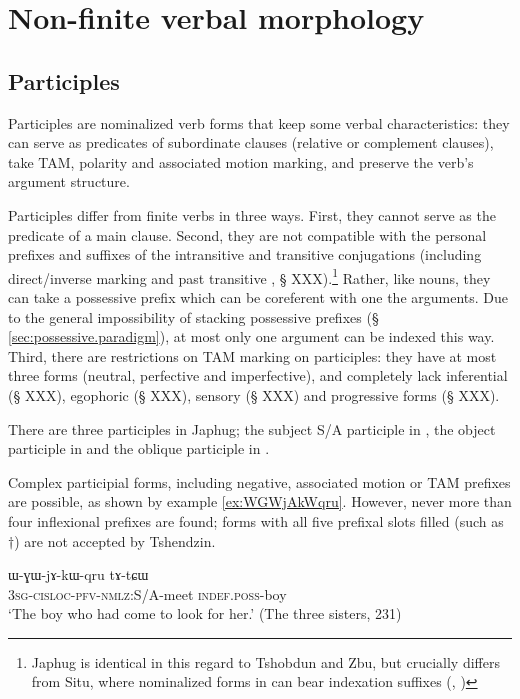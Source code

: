 \chapter{Non-finite verbal morphology}

\section{Participles}
Participles are nominalized verb forms that keep some verbal characteristics: they can serve as predicates of subordinate clauses (relative or complement clauses), take TAM, polarity and associated motion marking, and preserve the verb's argument structure.

Participles differ from finite verbs in three ways. First, they cannot serve as the predicate of a main clause. Second, they are not compatible with the personal prefixes and suffixes of the intransitive and transitive conjugations (including direct/inverse marking and past transitive , § XXX).\footnote{Japhug is identical in this regard to Tshobdun and Zbu, but crucially differs from Situ, where nominalized forms in  can bear indexation suffixes (\citet{jackson06guanxiju}, \citet{jacksonlin07}) } Rather, like nouns, they can take a possessive prefix which can be coreferent with one the arguments. Due to the general impossibility of stacking possessive prefixes (§ \ref{sec:possessive.paradigm}), at most only one argument can be indexed this way. Third, there are restrictions on TAM marking on participles: they have at most three forms (neutral, perfective and imperfective), and completely lack inferential (§ XXX), egophoric (§ XXX), sensory (§ XXX) and progressive forms (§ XXX).

There are three participles in Japhug; the subject S/A participle in , the object participle in  and the oblique participle in . 

Complex participial forms, including negative, associated motion or TAM prefixes are possible, as shown by example \ref{ex:WGWjAkWqru}. However, never more than four inflexional prefixes are found; forms with all five prefixal slots filled (such as $\dagger$) are not accepted by Tshendzin.

 \begin{exe}
\ex \label{ex:WGWjAkWqru}
\gll ɯ-ɣɯ-jɤ-kɯ-qru  	tɤ-tɕɯ  	   \\
  \textsc{3sg}-\textsc{cisloc}-\textsc{pfv}-\textsc{nmlz}:S/A-meet \textsc{indef}.\textsc{poss}-boy   \\
\glt `The boy who had come to look for her.' (The three sisters, 231)
 \end{exe}

